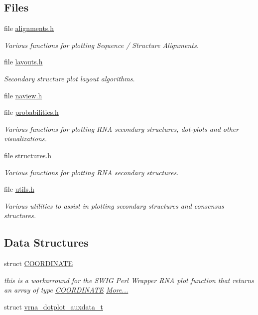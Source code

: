 \subsection*{Files}
\begin{DoxyCompactItemize}
\item 
file \hyperlink{plotting_2alignments_8h}{alignments.\+h}
\begin{DoxyCompactList}\small\item\em Various functions for plotting Sequence / Structure Alignments. \end{DoxyCompactList}\item 
file \hyperlink{layouts_8h}{layouts.\+h}
\begin{DoxyCompactList}\small\item\em Secondary structure plot layout algorithms. \end{DoxyCompactList}\item 
file \hyperlink{plotting_2naview_8h}{naview.\+h}
\item 
file \hyperlink{probabilities_8h}{probabilities.\+h}
\begin{DoxyCompactList}\small\item\em Various functions for plotting R\+NA secondary structures, dot-\/plots and other visualizations. \end{DoxyCompactList}\item 
file \hyperlink{plotting_2structures_8h}{structures.\+h}
\begin{DoxyCompactList}\small\item\em Various functions for plotting R\+NA secondary structures. \end{DoxyCompactList}\item 
file \hyperlink{plotting_2utils_8h}{utils.\+h}
\begin{DoxyCompactList}\small\item\em Various utilities to assist in plotting secondary structures and consensus structures. \end{DoxyCompactList}\end{DoxyCompactItemize}
\subsection*{Data Structures}
\begin{DoxyCompactItemize}
\item 
struct \hyperlink{group__plotting__utils_structCOORDINATE}{C\+O\+O\+R\+D\+I\+N\+A\+TE}
\begin{DoxyCompactList}\small\item\em this is a workarround for the S\+W\+IG Perl Wrapper R\+NA plot function that returns an array of type \hyperlink{group__plotting__utils_structCOORDINATE}{C\+O\+O\+R\+D\+I\+N\+A\+TE}  \hyperlink{group__plotting__utils_structCOORDINATE}{More...}\end{DoxyCompactList}\item 
struct \hyperlink{group__plotting__utils_structvrna__dotplot__auxdata__t}{vrna\+\_\+dotplot\+\_\+auxdata\+\_\+t}
\end{DoxyCompactItemize}
